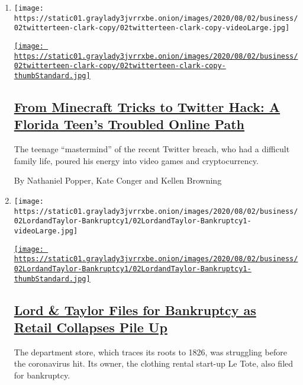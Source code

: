 \begin{enumerate}
\def\labelenumi{\arabic{enumi}.}
\item
  \texttt{[image: https://static01.graylady3jvrrxbe.onion/images/2020/08/02/business/02twitterteen-clark-copy/02twitterteen-clark-copy-videoLarge.jpg]}

  \href{/2020/08/02/technology/florida-teenager-twitter-hack.html}{\texttt{[image: https://static01.graylady3jvrrxbe.onion/images/2020/08/02/business/02twitterteen-clark-copy/02twitterteen-clark-copy-thumbStandard.jpg]}}

  \hypertarget{from-minecraft-tricks-to-twitter-hack-a-florida-teens-troubled-online-path}{%
  \subsection{\texorpdfstring{\href{/2020/08/02/technology/florida-teenager-twitter-hack.html}{From
  Minecraft Tricks to Twitter Hack: A Florida Teen's Troubled Online
  Path}}{From Minecraft Tricks to Twitter Hack: A Florida Teen's Troubled Online Path}}\label{from-minecraft-tricks-to-twitter-hack-a-florida-teens-troubled-online-path}}

  The teenage ``mastermind'' of the recent Twitter breach, who had a
  difficult family life, poured his energy into video games and
  cryptocurrency.

  By Nathaniel Popper, Kate Conger and Kellen Browning
\item
  \texttt{[image: https://static01.graylady3jvrrxbe.onion/images/2020/08/02/business/02LordandTaylor-Bankruptcy1/02LordandTaylor-Bankruptcy1-videoLarge.jpg]}

  \href{/2020/08/02/business/Lord-and-Taylor-Bankruptcy.html}{\texttt{[image: https://static01.graylady3jvrrxbe.onion/images/2020/08/02/business/02LordandTaylor-Bankruptcy1/02LordandTaylor-Bankruptcy1-thumbStandard.jpg]}}

  \hypertarget{lord--taylor-files-for-bankruptcy-as-retail-collapses-pile-up}{%
  \subsection{\texorpdfstring{\href{/2020/08/02/business/Lord-and-Taylor-Bankruptcy.html}{Lord
  \& Taylor Files for Bankruptcy as Retail Collapses Pile
  Up}}{Lord \& Taylor Files for Bankruptcy as Retail Collapses Pile Up}}\label{lord--taylor-files-for-bankruptcy-as-retail-collapses-pile-up}}

  The department store, which traces its roots to 1826, was struggling
  before the coronavirus hit. Its owner, the clothing rental start-up Le
  Tote, also filed for bankruptcy.


\end{enumerate}
